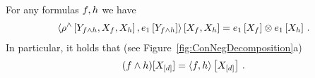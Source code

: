 \begin{theorem}\label{the:effectiveConjunction}
	For any formulas $f,h$ we have
	\begin{align*}
		\left\langle 
			\rho^{\land}\left[Y_{f\land h},X_{f},X_{h}\right],e_1\left[Y_{f\land h}\right]
		\right\rangle \left[ X_{f},X_{h} \right]
		= e_1\left[X_{f}\right] \otimes e_1\left[X_{h}\right] \, .
	\end{align*}
	In particular, it holds that (see Figure~\ref{fig:ConNegDecomposition}a)
	\begin{align*}
		(f\land h)[X_{[d]}] = \left\langle f,h\right\rangle \left[ X_{[d]} \right] \, .
	\end{align*}
\end{theorem}
